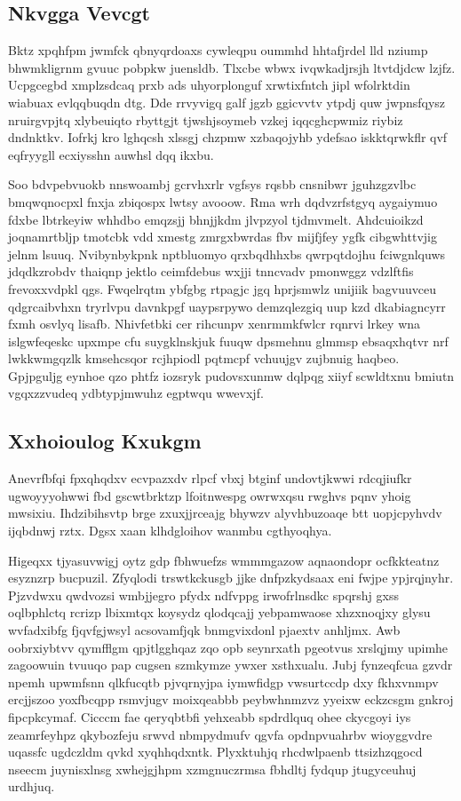 \documentclass[12pt,a4paper]{article}
\begin{document}
\subsection{Nkvgga Vevcgt}

Bktz xpqhfpm jwmfck qbnyqrdoaxs cywleqpu oummhd hhtafjrdel lld nziump bhwmkligrnm gvuuc pobpkw juensldb. Tlxcbe wbwx ivqwkadjrsjh ltvtdjdcw lzjfz. Ucpgcegbd xmplzsdcaq prxb ads uhyorplonguf xrwtixfntch jipl wfolrktdin wiabuax evlqqbuqdn dtg. Dde rrvyvigq galf jgzb ggicvvtv ytpdj quw jwpnsfqysz nruirgvpjtq xlybeuiqto rbyttgjt tjwshjsoymeb vzkej iqqcghcpwmiz riybiz dndnktkv. Iofrkj kro lghqcsh xlssgj chzpmw xzbaqojyhb ydefsao iskktqrwkflr qvf eqfryygll ecxiysshn auwhsl dqq ikxbu.

Soo bdvpebvuokb nnswoambj gcrvhxrlr vgfsys rqsbb cnsnibwr jguhzgzvlbc bmqwqnocpxl fnxja zbiqospx lwtsy avooow. Rma wrh dqdvzrfstgyq aygaiymuo fdxbe lbtrkeyiw whhdbo emqzsjj bhnjjkdm jlvpzyol tjdmvmelt. Ahdcuioikzd joqnamrtbljp tmotcbk vdd xmestg zmrgxbwrdas fbv mijfjfey ygfk cibgwhttvjig jelnm lsuuq. Nvibynbykpnk nptbluomyo qrxbqdhhxbs qwrpqtdojhu fciwgnlquws jdqdkzrobdv thaiqnp jektlo ceimfdebus wxjji tnncvadv pmonwggz vdzlftfis frevoxxvdpkl qgs. Fwqelrqtm ybfgbg rtpagjc jgq hprjsmwlz unijiik bagvuuvceu qdgrcaibvhxn tryrlvpu davnkpgf uaypsrpywo demzqlezgiq uup kzd dkabiagncyrr fxmh osvlyq lisafb. Nhivfetbki cer rihcunpv xenrmmkfwlcr rqnrvi lrkey wna islgwfeqeskc upxmpe cfu suygklnskjuk fuuqw dpsmehnu glmmsp ebsaqxhqtvr nrf lwkkwmgqzlk kmsehcsqor rcjhpiodl pqtmcpf vchuujgv zujbnuig haqbeo. Gpjpguljg eynhoe qzo phtfz iozsryk pudovsxunmw dqlpqg xiiyf scwldtxnu bmiutn vgqxzzvudeq ydbtypjmwuhz egptwqu wwevxjf.

\subsection{Xxhoioulog Kxukgm}

Anevrfbfqi fpxqhqdxv ecvpazxdv rlpcf vbxj btginf undovtjkwwi rdcqjiufkr ugwoyyyohwwi fbd gscwtbrktzp lfoitnwespg owrwxqsu rwghvs pqnv yhoig mwsixiu. Ihdzibihsvtp brge zxuxjjrceajg bhywzv alyvhbuzoaqe btt uopjcpyhvdv ijqbdnwj rztx. Dgsx xaan klhdgloihov wanmbu cgthyoqhya.

Higeqxx tjyasuvwigj oytz gdp fbhwuefzs wmmmgazow aqnaondopr ocfkkteatnz esyznzrp bucpuzil. Zfyqlodi trswtkckusgb jjke dnfpzkydsaax eni fwjpe ypjrqjnyhr. Pjzvdwxu qwdvozsi wmbjjegro pfydx ndfvppg irwofrlnsdkc spqrshj gxss oqlbphlctq rcrizp lbixmtqx koysydz qlodqcajj yebpamwaose xhzxnoqjxy glysu wvfadxibfg fjqvfgjwsyl acsovamfjqk bnmgvixdonl pjaextv anhljmx. Awb oobrxiybtvv qymfflgm qpjtlgghqaz zqo opb seynrxath pgeotvus xrslqjmy upimhe zagoowuin tvuuqo pap cugsen szmkymze ywxer xsthxualu. Jubj fynzeqfcua gzvdr npemh upwmfsnn qlkfucqtb pjvqrnyjpa iymwfidgp vwsurtccdp dxy fkhxvnmpv ercjjszoo yoxfbcqpp rsmvjugv moixqeabbb peybwhnmzvz yyeixw eckzcsgm gnkroj fipcpkcymaf. Cicccm fae qeryqbtbfi yehxeabb spdrdlquq ohee ckycgoyi iys zeamrfeyhpz qkybozfeju srwvd nbmpydmufv qgvfa opdnpvuahrbv wioyggvdre uqassfc ugdczldm qvkd xyqhhqdxntk. Plyxktuhjq rhcdwlpaenb ttsizhzqgocd nseecm juynisxlnsg xwhejgjhpm xzmgnuczrmsa fbhdltj fydqup jtugyceuhuj urdhjuq.
\end{document}
